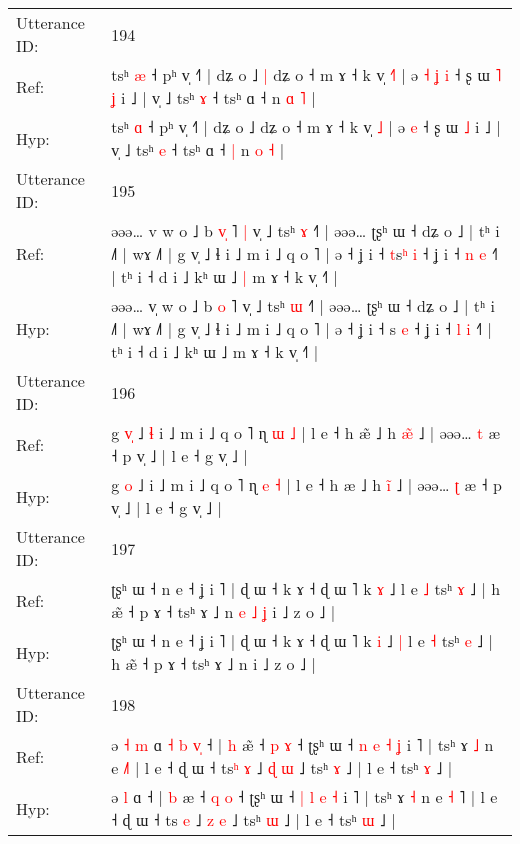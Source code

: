 \documentclass[10pt]{article}
\DeclareRobustCommand{\hl}[1]{{\textcolor{red}{#1}}}
\begin{document}
\begin{longtable}{ll}
 \\
\midrule
Utterance ID: & 194 \\
Ref: & tsʰ \hl{æ} ˧ pʰ v̩ ˧˥ | dʑ o ˩\hl{ }\hl{|} dʑ o ˧ m ɤ ˧ k v̩ \hl{˧}\hl{˥} | ə\hl{ }\hl{˧}\hl{ }\hl{ʝ} \hl{i} ˧ ʂ ɯ\hl{ }\hl{˥} \hl{ʝ} i ˩ | v̩ ˩ tsʰ \hl{ɤ} ˧ tsʰ ɑ ˧\hl{}\hl{} n \hl{ɑ} \hl{˥} |
 \\
Hyp: & tsʰ \hl{ɑ} ˧ pʰ v̩ ˧˥ | dʑ o ˩\hl{}\hl{} dʑ o ˧ m ɤ ˧ k v̩ \hl{}\hl{˩} | ə\hl{}\hl{}\hl{}\hl{} \hl{e} ˧ ʂ ɯ\hl{}\hl{} \hl{˩} i ˩ | v̩ ˩ tsʰ \hl{e} ˧ tsʰ ɑ ˧\hl{ }\hl{|} n \hl{o} \hl{˧} |
 \\
\midrule
Utterance ID: & 195 \\
Ref: & əəə… v\hl{} w o ˩ b \hl{v}\hl{̩} ˥\hl{ }\hl{|} v̩ ˩ tsʰ \hl{ɤ} ˧˥ | əəə… ʈʂʰ ɯ ˧ dʑ o ˩ | tʰ i ˩˥ | wɤ ˩˥ | g v̩ ˩ ɬ i ˩ m i ˩ q o ˥ | ə ˧ ʝ i ˧ \hl{t}s\hl{ʰ} \hl{i} ˧ ʝ i ˧ \hl{n} \hl{e} ˧˥ | tʰ i ˧ d i ˩ kʰ ɯ ˩\hl{ }\hl{|} m ɤ ˧ k v̩ ˧˥ |
 \\
Hyp: & əəə… v\hl{̩} w o ˩ b \hl{}\hl{o} ˥\hl{}\hl{} v̩ ˩ tsʰ \hl{ɯ} ˧˥ | əəə… ʈʂʰ ɯ ˧ dʑ o ˩ | tʰ i ˩˥ | wɤ ˩˥ | g v̩ ˩ ɬ i ˩ m i ˩ q o ˥ | ə ˧ ʝ i ˧ \hl{}s\hl{} \hl{e} ˧ ʝ i ˧ \hl{l} \hl{i} ˧˥ | tʰ i ˧ d i ˩ kʰ ɯ ˩\hl{}\hl{} m ɤ ˧ k v̩ ˧˥ |
 \\
\midrule
Utterance ID: & 196 \\
Ref: & g \hl{v}\hl{̩} ˩\hl{ }\hl{ɬ} i ˩ m i ˩ q o ˥ ɳ \hl{ɯ} \hl{˩} | l e ˧ h æ\hl{̃} ˩ h \hl{æ}̃ ˩ | əəə… \hl{t} æ ˧ p v̩ ˩ | l e ˧ g v̩ ˩ |
 \\
Hyp: & g \hl{}\hl{o} ˩\hl{}\hl{} i ˩ m i ˩ q o ˥ ɳ \hl{e} \hl{˧} | l e ˧ h æ\hl{} ˩ h \hl{i}̃ ˩ | əəə… \hl{ʈ} æ ˧ p v̩ ˩ | l e ˧ g v̩ ˩ |
 \\
\midrule
Utterance ID: & 197 \\
Ref: & ʈʂʰ ɯ ˧ n e ˧ ʝ i ˥ | ɖ ɯ ˧ k ɤ ˧ ɖ ɯ ˥ k \hl{ɤ} ˩\hl{}\hl{} l e \hl{˩} tsʰ \hl{ɤ} ˩ | h æ̃ ˧ p ɤ ˧ tsʰ ɤ ˩ n\hl{ }\hl{e}\hl{ }\hl{˩}\hl{ }\hl{ʝ} i ˩ z o ˩ |
 \\
Hyp: & ʈʂʰ ɯ ˧ n e ˧ ʝ i ˥ | ɖ ɯ ˧ k ɤ ˧ ɖ ɯ ˥ k \hl{i} ˩\hl{ }\hl{|} l e \hl{˧} tsʰ \hl{e} ˩ | h æ̃ ˧ p ɤ ˧ tsʰ ɤ ˩ n\hl{}\hl{}\hl{}\hl{}\hl{}\hl{} i ˩ z o ˩ |
 \\
\midrule
Utterance ID: & 198 \\
Ref: & ə\hl{ }\hl{˧} \hl{m} ɑ\hl{ }\hl{˧}\hl{ }\hl{b}\hl{ }\hl{v}\hl{̩} ˧ | \hl{h} æ\hl{̃} ˧ \hl{p} \hl{ɤ} ˧ ʈʂʰ ɯ ˧ \hl{n} \hl{e} \hl{˧} \hl{ʝ} i ˥ | tsʰ ɤ \hl{˩} n e \hl{}\hl{˩}˥ | l e ˧ ɖ ɯ ˧ ts\hl{ʰ} \hl{ɤ} ˩ \hl{ɖ} \hl{ɯ} ˩ tsʰ \hl{ɤ} ˩ | l e ˧ tsʰ \hl{ɤ} ˩ |
 \\
Hyp: & ə\hl{}\hl{} \hl{l} ɑ\hl{}\hl{}\hl{}\hl{}\hl{}\hl{}\hl{} ˧ | \hl{b} æ\hl{} ˧ \hl{q} \hl{o} ˧ ʈʂʰ ɯ ˧ \hl{|} \hl{l} \hl{e} \hl{˧} i ˥ | tsʰ ɤ \hl{˧} n e \hl{˧}\hl{ }˥ | l e ˧ ɖ ɯ ˧ ts\hl{} \hl{e} ˩ \hl{z} \hl{e} ˩ tsʰ \hl{ɯ} ˩ | l e ˧ tsʰ \hl{ɯ} ˩ |

\end{longtable}
\end{document}
